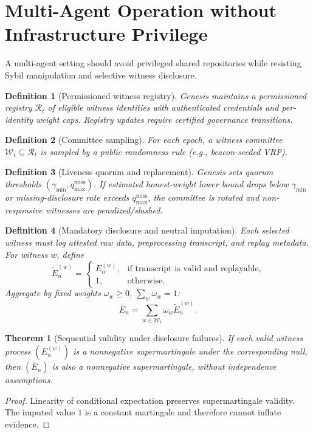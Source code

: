 \documentclass[11pt,a4paper]{article}
\newtheorem{theorem}{Theorem}[section]
\newtheorem{definition}{Definition}[section]
\begin{document}
\section{Multi-Agent Operation without Infrastructure Privilege}

A multi-agent setting should avoid privileged shared repositories while resisting Sybil manipulation and selective witness disclosure.

\begin{definition}[Permissioned witness registry]
Genesis maintains a permissioned registry $\mathcal{R}_t$ of eligible witness identities with authenticated credentials and per-identity weight caps.
Registry updates require certified governance transitions.
\end{definition}

\begin{definition}[Committee sampling]
For each epoch, a witness committee $\mathcal{W}_t\subseteq\mathcal{R}_t$ is sampled by a public randomness rule (e.g., beacon-seeded VRF).
\end{definition}

\begin{definition}[Liveness quorum and replacement]
Genesis sets quorum thresholds $(\gamma_{\min},q_{\max}^{\mathrm{miss}})$.
If estimated honest-weight lower bound drops below $\gamma_{\min}$ or missing-disclosure rate exceeds $q_{\max}^{\mathrm{miss}}$, the committee is rotated and non-responsive witnesses are penalized/slashed.
\end{definition}

\begin{definition}[Mandatory disclosure and neutral imputation]
Each selected witness must log attested raw data, preprocessing transcript, and replay metadata.
For witness $w$, define
\[
\widetilde E_n^{(w)}=
\begin{cases}
E_n^{(w)}, & \text{if transcript is valid and replayable},\\
1, & \text{otherwise}.
\end{cases}
\]
Aggregate by fixed weights $\omega_w\ge0$, $\sum_w\omega_w=1$:
\[
\bar E_n=\sum_{w\in\mathcal{W}_t}\omega_w\widetilde E_n^{(w)}.
\]
\end{definition}

\begin{theorem}[Sequential validity under disclosure failures]
If each valid witness process $(E_n^{(w)})$ is a nonnegative supermartingale under the corresponding null, then $(\bar E_n)$ is also a nonnegative supermartingale, without independence assumptions.
\end{theorem}
\begin{proof}
Linearity of conditional expectation preserves supermartingale validity.
The imputed value $1$ is a constant martingale and therefore cannot inflate evidence.
\end{proof}
\end{document}
